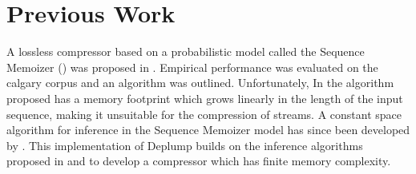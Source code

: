 \section{Previous Work}
\label{section:previous_work}

A lossless compressor based on a probabilistic model called the Sequence Memoizer (\cite{Wood2009}) was proposed in \cite{Gasthaus2010}.  Empirical performance was evaluated on the calgary corpus and an algorithm was outlined.  Unfortunately, In \cite{Gasthaus2010} the algorithm proposed has a memory footprint which grows linearly in the length of the input sequence, making it unsuitable for the compression of streams.  A constant space algorithm for inference in the Sequence Memoizer model has since been developed by \cite{Bartlett2010}.  This implementation of Deplump builds on the inference algorithms proposed in \cite{Bartlett2010}  and \cite{Gasthaus2010} to develop a compressor which has finite memory complexity. 